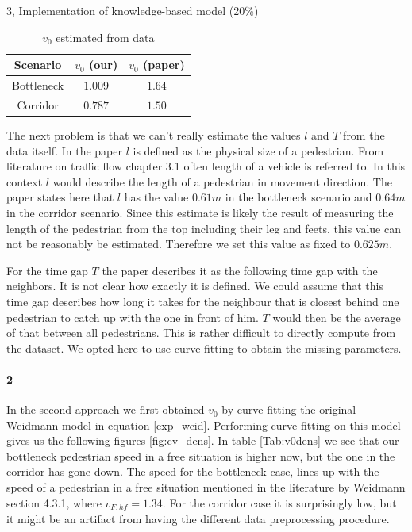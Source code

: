 \begin{task}{3, Implementation of knowledge-based model (20\%)}
\begin{table}[H]
\centering
\begin{tabular}{ |c|c|c| }
\hline
Scenario & $v_0$ (our) & $v_0$ (paper)\\
\hline
Bottleneck & $1.009$ & $1.64$\\
\hline
Corridor & $0.787$ & $1.50$\\
\hline
\end{tabular}
\caption{$v_0$ estimated from data}
\label{Tab:v0data}
\end{table}

The next problem is that we can't really estimate the values $l$ and $T$ from the data itself. In the paper $l$ is defined as the physical size of a pedestrian. From literature on traffic flow \cite{treiber2013traffic} chapter 3.1 often length of a vehicle is referred to. In this context $l$ would describe the length of a pedestrian in movement direction. The paper states here that $l$ has the value $0.61m$ in the bottleneck scenario and $0.64m$ in the corridor scenario. Since this estimate is likely the result of measuring the length of the pedestrian from the top including their leg and feets, this value can not be reasonably be estimated. Therefore we set this value as fixed to $0.625m$.

For the time gap $T$ the paper \cite{tordeux2020prediction} describes it as the following time gap with the neighbors. It is not clear how exactly it is defined. We could assume that this time gap describes how long it takes for the neighbour that is closest behind one pedestrian to catch up with the one in front of him. $T$ would then be the average of that between all pedestrians. This is rather difficult to directly compute from the dataset. We opted here to use curve fitting to obtain the missing parameters.

\paragraph{2} In the second approach we first obtained $v_0$ by curve fitting the original Weidmann model \cite{weidmann1993transporttechnik} in equation \ref{exp_weid}. Performing curve fitting on this model gives us the following figures \ref{fig:cv_dens}. In table \ref{Tab:v0dens} we see that our bottleneck pedestrian speed in a free situation is higher now, but the one in the corridor has gone down. The speed for the bottleneck case, lines up with the speed of a pedestrian in a free situation mentioned in the literature by Weidmann \cite{weidmann1993transporttechnik} section 4.3.1, where $v_{F,hf}=1.34$. For the corridor case it is surprisingly low, but it might be an artifact from having the different data preprocessing procedure.


\end{task}
